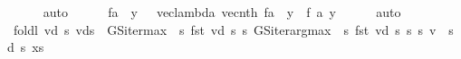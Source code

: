 \begin{isabellebody}
\ \ \ \ \isamarkupfalse%
\ auto\isanewline
\ \ \isamarkupfalse%
\ {}{\isacharcolon}{\kern0pt}\ {\isachardoublequoteopen}{\isacharparenleft}{\kern0pt}{\isacharparenleft}{\kern0pt}{\isachardollar}{\kern0pt}{\isacharparenright}{\kern0pt}\ f{\isacharparenright}{\kern0pt}{\isacharparenleft}{\kern0pt}a\ {\isacharcolon}{\kern0pt}{\isacharequal}{\kern0pt}\ y{\isacharparenright}{\kern0pt}\ {\isacharequal}{\kern0pt}\ {\isacharparenleft}{\kern0pt}{\isachardollar}{\kern0pt}{\isacharparenright}{\kern0pt}\ {\isacharparenleft}{\kern0pt}vec{\isacharunderscore}{\kern0pt}lambda\ {\isacharparenleft}{\kern0pt}{\isacharparenleft}{\kern0pt}vec{\isacharunderscore}{\kern0pt}nth\ f{\isacharparenright}{\kern0pt}{\isacharparenleft}{\kern0pt}a\ {\isacharcolon}{\kern0pt}{\isacharequal}{\kern0pt}\ y{\isacharparenright}{\kern0pt}{\isacharparenright}{\kern0pt}{\isacharparenright}{\kern0pt}{\isachardoublequoteclose}\ \ f\ a\ y\isanewline
\ \ \ \ \isamarkupfalse%
\ auto\isanewline
\ \ \isamarkupfalse%
\ {\isachardoublequoteopen}foldl\ {\isacharparenleft}{\kern0pt}{\isasymlambda}vd\ s{\isachardot}{\kern0pt}\ vd{\isacharparenleft}{\kern0pt}s\ {\isacharcolon}{\kern0pt}{\isacharequal}{\kern0pt}\ {\isacharparenleft}{\kern0pt}GS{\isacharunderscore}{\kern0pt}iter{\isacharunderscore}{\kern0pt}max\ {\isacharparenleft}{\kern0pt}{\isasymchi}\ s{\isachardot}{\kern0pt}\ fst\ {\isacharparenleft}{\kern0pt}vd\ s{\isacharparenright}{\kern0pt}{\isacharparenright}{\kern0pt}\ s{\isacharcomma}{\kern0pt}\ GS{\isacharunderscore}{\kern0pt}iter{\isacharunderscore}{\kern0pt}arg{\isacharunderscore}{\kern0pt}max\ {\isacharparenleft}{\kern0pt}{\isasymchi}\ s{\isachardot}{\kern0pt}\ fst\ {\isacharparenleft}{\kern0pt}vd\ s{\isacharparenright}{\kern0pt}{\isacharparenright}{\kern0pt}\ s{\isacharparenright}{\kern0pt}{\isacharparenright}{\kern0pt}{\isacharparenright}{\kern0pt}\ {\isacharparenleft}{\kern0pt}{\isasymlambda}s{\isachardot}{\kern0pt}\ {\isacharparenleft}{\kern0pt}v\ {\isachardollar}{\kern0pt}\ s{\isacharcomma}{\kern0pt}\ d\ s{\isacharparenright}{\kern0pt}{\isacharparenright}{\kern0pt}\ xs\ {\isacharequal}{\kern0pt}\isanewline

\end{isabellebody}
